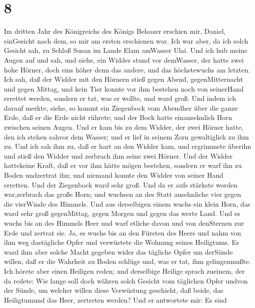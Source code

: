 \hypertarget{section-7}{%
\section{8}\label{section-7}}

 Im dritten Jahr des Königreichs des Königs Belsazer
erschien mir, Daniel, einGesicht nach dem, so mir am ersten erschienen
war.  Ich war aber, da ich solch Gesicht sah, zu Schloß
Susan im Lande Elam amWasser Ulai.  Und ich hub meine Augen
auf und sah, und siehe, ein Widder stund vor demWasser, der hatte zwei
hohe Hörner, doch eins höher denn das andere, und das höchstewuchs am
letzten.  Ich sah, daß der Widder mit den Hörnern stieß
gegen Abend, gegenMitternacht und gegen Mittag, und kein Tier konnte vor
ihm bestehen noch von seinerHand errettet werden, sondern er tat, was er
wollte, und ward groß.  Und indem ich darauf merkte, siehe,
so kommt ein Ziegenbock vom Abendher über die ganze Erde, daß er die
Erde nicht rührete; und der Bock hatte einansehnlich Horn zwischen
seinen Augen.  Und er kam bis zu dem Widder, der zwei Hörner
hatte, den ich stehen sahvor dem Wasser; und er lief in seinem Zorn
gewaltiglich zu ihm zu.  Und ich sah ihm zu, daß er hart an
den Widder kam, und ergrimmete überihn und stieß den Widder und zerbrach
ihm seine zwei Hörner. Und der Widder hattekeine Kraft, daß er vor ihm
hätte mögen bestehen, sondern er warf ihn zu Boden undzertrat ihn; und
niemand konnte den Widder von seiner Hand erretten.  Und der
Ziegenbock ward sehr groß. Und da er aufs stärkste worden war,zerbrach
das große Horn; und wuchsen an des Statt ansehnliche vier gegen die
vierWinde des Himmels.  Und aus derselbigen einem wuchs ein
klein Horn, das ward sehr groß gegenMittag, gegen Morgen und gegen das
werte Land.  Und es wuchs bis an des Himmels Heer und warf
etliche davon und von denSternen zur Erde und zertrat sie. 
Ja, es wuchs bis an den Fürsten des Heers und nahm von ihm weg
dastägliche Opfer und verwüstete die Wohnung seines Heiligtums.
 Es ward ihm aber solche Macht gegeben wider das tägliche
Opfer um derSünde willen, daß er die Wahrheit zu Boden schlüge und, was
er tat, ihm gelingenmußte.  Ich hörete aber einen Heiligen
reden; und derselbige Heilige sprach zueinem, der da redete: Wie lange
soll doch währen solch Gesicht vom täglichen Opfer undvon der Sünde, um
welcher willen diese Verwüstung geschieht, daß beide, das Heiligtumund
das Heer, zertreten werden?  Und er antwortete mir: Es sind
